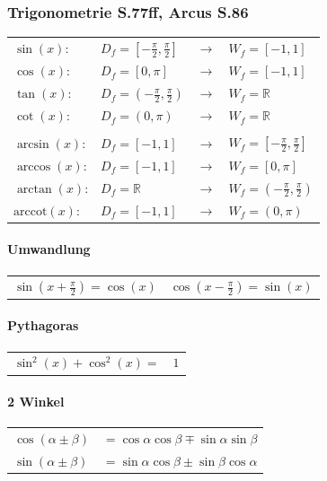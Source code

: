 		\subsubsection{Trigonometrie S.77ff, Arcus S.86}
			\begin{tabular}{llll}
				$\sin(x)$: & $D_f=[-\frac{\pi}{2},\frac{\pi}{2}]$ & $\rightarrow$ &  $W_f=[-1,1]$ \\
				$\cos(x)$: & $D_f=[0,\pi]$ & $\rightarrow$ &  $W_f=[-1,1]$  \\
				$\tan(x)$: & $D_f=(-\frac{\pi}{2},\frac{\pi}{2})$ & $\rightarrow$ & $W_f=\mathbb{R}$\\
				$\cot(x)$: & $D_f=(0,\pi)$ & $\rightarrow$ &  $W_f=\mathbb{R}$ \\
				\\
				$\arcsin(x)$: & $D_f=[-1,1] $ & $\rightarrow$ & $ W_f=[-\frac{\pi}{2},\frac{\pi}{2}]$ \\
				$\arccos(x)$: & $D_f=[-1,1]$ & $\rightarrow$ &  $W_f=[0,\pi]$ \\
				$\arctan(x)$: & $D_f=\mathbb{R}$ & $\rightarrow$ &  $W_f=(-\frac{\pi}{2},\frac{\pi}{2})$ \\
				$\mathrm{arccot}(x)$: & $D_f=[-1,1]$ & $\rightarrow$ &  $W_f=(0,\pi)$ \\		
			\end{tabular}

			\paragraph{Umwandlung}
				\begin{tabular}{ll}
					$\sin(x + \frac{\pi}{2}) = \cos(x)$ & $\cos(x - \frac{\pi}{2}) = \sin(x)$ \\	
				\end{tabular}

			\paragraph{Pythagoras}
				\begin{tabular}{ll}
					$\sin^2(x) + \cos^2(x) =$ & $ 1 $ \\
				\end{tabular}

			\paragraph{2 Winkel}
				\begin{tabular}{ll}
					$\cos(\alpha \pm \beta)$ & $= \cos\alpha\cos\beta \mp \sin\alpha\sin\beta$ \\
					$\sin(\alpha \pm \beta)$ & $= \sin\alpha\cos\beta \pm \sin\beta\cos\alpha$ \\
				\end{tabular}

